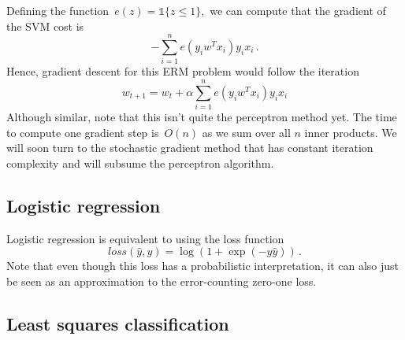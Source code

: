 \documentclass{tufte-book}
\begin{document}
Defining the function~\(e(z) = \mathbb{1}\{ z\leq 1 \},\) we can compute
that the gradient of the SVM cost is \[
    -\sum_{i=1}^n e(y_i w^T x_i) y_i x_i \,.
\] Hence, gradient descent for this ERM problem would follow the
iteration \[
    w_{t+1} = w_t + \alpha \sum_{i=1}^n e(y_i w^T x_i) y_i x_i
\] Although similar, note that this isn't quite the perceptron method
yet. The time to compute one gradient step is~\(O(n)\) as we sum over
all \(n\) inner products. We will soon turn to the stochastic gradient
method that has constant iteration complexity and will subsume the
perceptron algorithm.

\hypertarget{logistic-regression}{%
\subsection{Logistic regression}\label{logistic-regression}}


Logistic regression is equivalent to using the loss
function \[
\mathit{loss}(\hat y,y) = \log \left(1+\exp(-y\hat y)\right)\,.
\] Note that even though this loss has a probabilistic interpretation,
it can also just be seen as an approximation to the error-counting
zero-one loss.

\hypertarget{least-squares-classification}{%
\subsection{Least squares
classification}\label{least-squares-classification}}
\end{document}

